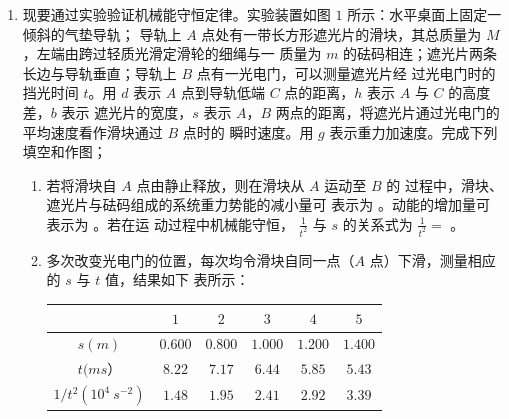 \begin{enumerate}
\begin{enumerate}
\end{enumerate}


\newpage
\item 
{}
现要通过实验验证机械能守恒定律。实验装置如图 $ 1 $ 所示：水平桌面上固定一倾斜的气垫导轨；
导轨上 $ A $ 点处有一带长方形遮光片的滑块，其总质量为 $ M $，左端由跨过轻质光滑定滑轮的细绳与一
质量为 $ m $ 的砝码相连；遮光片两条长边与导轨垂直；导轨上 $ B $ 点有一光电门，可以测量遮光片经
过光电门时的挡光时间 $ t $。用 $ d $ 表示 $ A $ 点到导轨低端 $ C $ 点的距离，$ h $ 表示 $ A $ 与 $ C $ 的高度差，$ b $ 表示
遮光片的宽度，$ s $ 表示 $ A $，$ B $ 两点的距离，将遮光片通过光电门的平均速度看作滑块通过 $ B $ 点时的
瞬时速度。用 $ g $ 表示重力加速度。完成下列填空和作图；
\begin{figure}[h!]
\centering

\end{figure}

\begin{enumerate}
\renewcommand{\labelenumi}{\arabic{enumi}.}
\item
若将滑块自 $ A $ 点由静止释放，则在滑块从 $ A $ 运动至 $ B $ 的
过程中，滑块、遮光片与砝码组成的系统重力势能的减小量可
表示为
。动能的增加量可表示为
。若在运
动过程中机械能守恒，
$ \frac{1}{t^{2}} $
与 $ s $ 的关系式为 $\frac{1}{t^{2}}=$  。





\item 
多次改变光电门的位置，每次均令滑块自同一点（$ A $ 点）下滑，测量相应的 $ s $ 与 $ t $ 值，结果如下
表所示：

\begin{table}[h!]
\centering 
\begin{tabular}{|c|c|c|c|c|c|}
\hline 
& $ 1 $ & $ 2 $ & $ 3 $ & $ 4 $ & $ 5 $
 \\
\hline
$ s(m) $ & $ 0.600 $ & $ 0.800 $ & $ 1.000 $ & $ 1.200 $ & $ 1.400 $
 \\
\hline
$ t(ms $） & $ 8.22 $ & $ 7.17 $ & $ 6.44 $ & $ 5.85 $ & $ 5.43 $
 \\
\hline
$ 1/ t^{2} (10^4 \ s^{-2}) $ & $ 1.48 $ & $ 1.95 $ & $ 2.41 $ & $ 2.92 $ & $ 3.39 $\\ 
\hline 
\end{tabular}
\end{table} 





\end{enumerate}
\end{enumerate}

